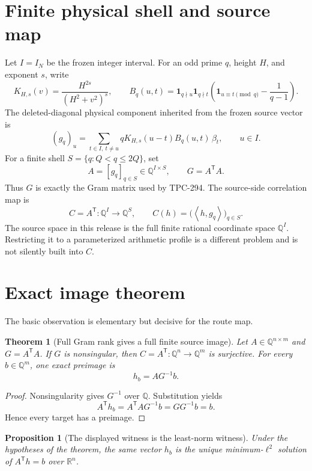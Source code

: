 \documentclass[10pt]{article}
\newtheorem{theorem}{Theorem}
\newtheorem{proposition}{Proposition}
\newcommand{\Q}{\mathbb{Q}}
\newcommand{\R}{\mathbb{R}}
\newcommand{\ip}[2]{\left\langle #1,#2\right\rangle}
\begin{document}
\section{Finite physical shell and source map}

Let $I=I_N$ be the frozen integer interval.  For an odd prime $q$, height
$H$, and exponent $s$, write
\[
 K_{H,s}(v)=\frac{H^{2s}}{(H^2+v^2)^s},\qquad
 B_q(u,t)=\mathbf 1_{q\nmid u}\mathbf 1_{q\nmid t}
 \left(\mathbf 1_{u\equiv t\pmod q}-\frac1{q-1}\right).
\]
The deleted-diagonal physical component inherited from the frozen source
vector is
\[
 (g_q)_u=\sum_{t\in I,\ t\ne u}
 qK_{H,s}(u-t)B_q(u,t)\,\beta_t,
 \qquad u\in I.
 \label{eq:physical}
\]
For a finite shell $S=\{q:Q<q\le 2Q\}$, set
\[
 A=[g_q]_{q\in S}\in\Q^{I\times S},\qquad
 G=A^{\mathsf T}A.
 \label{eq:matrix}
\]
Thus $G$ is exactly the Gram matrix used by TPC-294.  The source-side
correlation map is
\[
 C=A^{\mathsf T}:\Q^{I}\longrightarrow\Q^{S},\qquad
 C(h)=\bigl(\ip{h}{g_q}\bigr)_{q\in S}.
 \label{eq:correlation}
\]
The source space in this release is the full finite rational coordinate
space $\Q^I$.  Restricting it to a parameterized arithmetic profile is a
different problem and is not silently built into $C$.

\section{Exact image theorem}

The basic observation is elementary but decisive for the route map.

\begin{theorem}[Full Gram rank gives a full finite source image]
Let $A\in\Q^{n\times m}$ and $G=A^{\mathsf T}A$.  If $G$ is nonsingular,
then $C=A^{\mathsf T}:\Q^n\to\Q^m$ is surjective.  For every
$b\in\Q^m$, one exact preimage is
\[
 h_b=AG^{-1}b.
 \label{eq:witness}
\]
\end{theorem}

\begin{proof}
Nonsingularity gives $G^{-1}$ over $\Q$.  Substitution yields
\[
 A^{\mathsf T}h_b=A^{\mathsf T}AG^{-1}b=GG^{-1}b=b.
\]
Hence every target has a preimage.
\end{proof}

\begin{proposition}[The displayed witness is the least-norm witness]
Under the hypotheses of the theorem, the same vector $h_b$ is the unique
minimum-$\ell^2$ solution of $A^{\mathsf T}h=b$ over $\R^n$.
\end{proposition}
\end{document}

